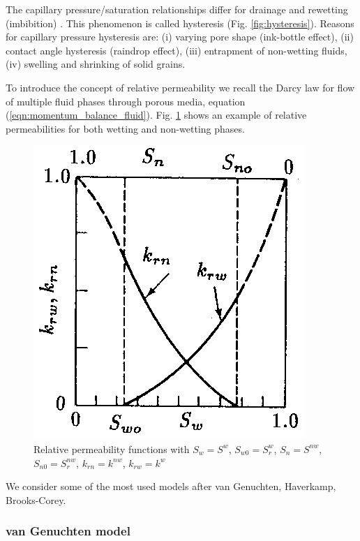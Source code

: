 The capillary pressure/saturation relationships
differ for drainage and rewetting (imbibition) \cite{Mua:76}. This phenomenon is
called hysteresis (Fig. \ref{fig:hysteresis}). Reasons for capillary pressure hysteresis are:
(i) varying pore shape (ink-bottle effect), (ii) contact angle
hysteresis (raindrop effect), (iii) entrapment of non-wetting
fluids, (iv) swelling and shrinking of solid grains.

To introduce the concept of relative permeability we recall the
Darcy law for flow of multiple fluid phases through porous
media, equation (\ref{eqn:momentum_balance_fluid}).
Fig. \ref{fig:k_rel} shows an example of relative permeabilities for both wetting and non-wetting phases.

\begin{figure}[htb!]
\begin{center}
\includegraphics[width=0.45\columnwidth]{figures/K_REL.EPS}
\caption{Relative permeability functions \cite{Bea:72} with
$S_{w} = S^w$, $S_{w0} =
S_r^w$, $S_{n} = S^{nw}$,
$S_{n0} = S_r^{nw}$, $k_{rn} = k^{nw}$,
$k_{rw} = k^w$ } 
\label{fig:k_rel}
\end{center}
\end{figure}
%

We consider some of the most used models after van Genuchten, Haverkamp, Brooks-Corey.

\subsubsection*{van Genuchten model \cite{Van:80}}

